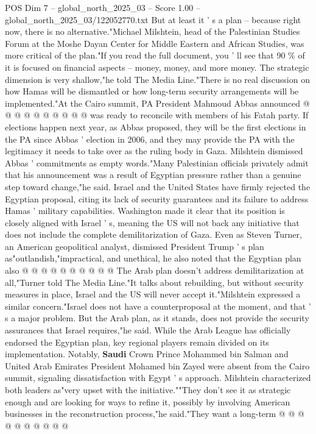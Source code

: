 \begin{textsample}{POS Dim 7 – global\_north\_2025\_03 – Score 1.00 – global\_north\_2025\_03/122052770.txt}
But at least it ' s a plan -- because right now, there is no alternative."Michael Milshtein, head of the Palestinian Studies Forum at the Moshe Dayan Center for Middle Eastern and African Studies, was more critical of the plan."If you read the full document, you ' ll see that 90 \% of it is focused on financial aspects -- money, money, and more money.
The strategic dimension is very shallow,"he told The Media Line."There is no real discussion on how Hamas will be dismantled or how long-term security arrangements will be implemented."At the Cairo summit, PA President Mahmoud Abbas announced @ @ @ @ @ @ @ @ @ @ was ready to reconcile with members of his Fatah party.
If elections happen next year, as Abbas proposed, they will be the first elections in the PA since Abbas ' election in 2006, and they may provide the PA with the legitimacy it needs to take over as the ruling body in Gaza.
Milshtein dismissed Abbas ' commitments as empty words."Many Palestinian officials privately admit that his announcement was a result of Egyptian pressure rather than a genuine step toward change,"he said.
Israel and the United States have firmly rejected the Egyptian proposal, citing its lack of security guarantees and its failure to address Hamas ' military capabilities.
Washington made it clear that its position is closely aligned with Israel ' s, meaning the US will not back any initiative that does not include the complete demilitarization of Gaza.
Even as Steven Turner, an American geopolitical analyst, dismissed President Trump ' s plan as"outlandish,"impractical, and unethical, he also noted that the Egyptian plan also @ @ @ @ @ @ @ @ @ @ The Arab plan doesn't address demilitarization at all,"Turner told The Media Line."It talks about rebuilding, but without security measures in place, Israel and the US will never accept it."Milshtein expressed a similar concern."Israel does not have a counterproposal at the moment, and that ' s a major problem.
But the Arab plan, as it stands, does not provide the security assurances that Israel requires,"he said.
While the Arab League has officially endorsed the Egyptian plan, key regional players remain divided on its implementation.
Notably, \textbf{Saudi} Crown Prince Mohammed bin Salman and United Arab Emirates President Mohamed bin Zayed were absent from the Cairo summit, signaling dissatisfaction with Egypt ' s approach.
Milshtein characterized both leaders as"very upset with the initiative.""They don't see it as strategic enough and are looking for ways to refine it, possibly by involving American businesses in the reconstruction process,"he said."They want a long-term @ @ @ @ @ @ @ @ @ @

\end{textsample}
